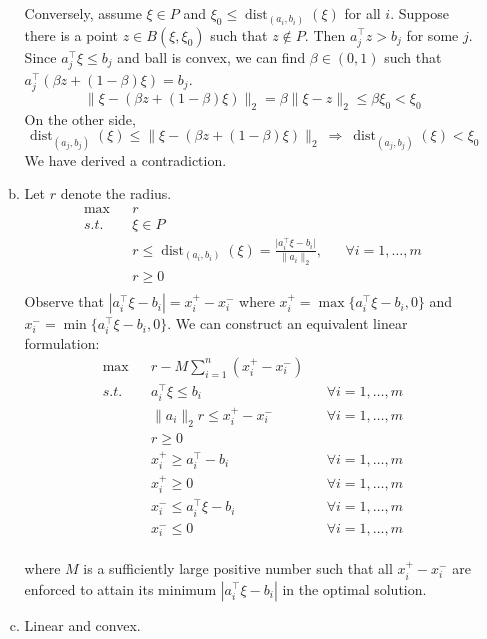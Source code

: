 \begin{enumerate}
\begin{enumerate}[(a)]
			Conversely, assume $\xi\in P$ and $\xi_0 \le \operatorname{dist}_{(a_i, b_i)}(\xi)$ for all $i$. Suppose there is a point $z\in B(\xi, \xi_0)$ such that $z\not \in P$. Then $a_j^\top z > b_j$ for some $j$. Since $a^\top_j\xi \le b_j$ and ball is convex, we can find $\beta\in (0,1)$ such that $a^\top_j(\beta z+ (1-\beta) \xi) = b_j$. 
			$$
			\lVert \xi - ( \beta z+ (1-\beta) \xi)\rVert_2 = \beta \lVert \xi-z\rVert_2 \le \beta \xi_0 < \xi_0
			$$
			On the other side, 
			$$
			\operatorname{dist}_{(a_j,b_j)}(\xi) \le \lVert \xi - ( \beta z+ (1-\beta) \xi)\rVert_2 ~\Rightarrow~ \operatorname{dist}_{(a_j,b_j)}(\xi) < \xi_0
			$$
			We have derived a contradiction.
			\newpage 
			\item  Let $r$ denote the radius.
			$$
			\begin{aligned}
			&\max& &r&\\
			&s.t.& &\xi \in P&\\
			&& &r\le\operatorname{dist}_{(a_i,b_i)}(\xi) = \frac{\lvert a_i^\top \xi - b_i\rvert}{\lVert a_i\rVert_2},& &\forall i=1,\ldots,m\\
			&& &r\ge 0& &&\\
			\end{aligned}			
			$$
			Observe that $|a_i^\top \xi -b_i| = x_i^+-x_i^-$ where $x^+_i =  \max\{a_i^\top \xi -b_i ,0\}$ and $x^-_i = \min\{a_i^\top \xi -b_i ,0\}$. We can construct an equivalent linear formulation:
			\[
			\begin{aligned}
			&\max& &r -M\sum_{i=1}^n\left(x_i^+-x_i^-\right)&\\
			&s.t.& &a_i^\top\xi \le b_i& &\forall i=1,\ldots,m&\\
			&& &\lVert a_i\rVert_2 r\le x_i^+-x_i^-& &\forall i=1,\ldots,m&\\
			&& &r\ge 0& &&\\
			&& &x_i^+\ge a_i^\top-b_i& &\forall i=1,\ldots,m&\\
			&& &x_i^+\ge 0& &\forall i=1,\ldots,m&\\
			&& &x_i^-\le a_i^\top\xi -b_i& &\forall i=1,\ldots,m&\\
			&& &x_i^-\le 0& &\forall i=1,\ldots,m&\\
			\end{aligned}
			\]
			
			where $M$ is a sufficiently large positive number such that all $x_i^+-x_i^-$ are enforced to attain its minimum $|a_i^\top\xi - b_i|$ in the optimal solution.
			\item Linear and convex.
		\end{enumerate}


\end{enumerate}

